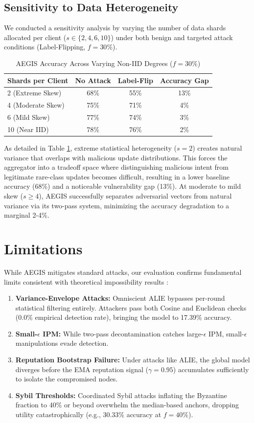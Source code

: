 \documentclass[10pt, conference]{IEEEtran}
\begin{document}
\subsection{Sensitivity to Data Heterogeneity}
We conducted a sensitivity analysis by varying the number of data shards allocated per client ($s \in \{2, 4, 6, 10\}$) under both benign and targeted attack conditions (Label-Flipping, $f=30\%$). 

\begin{table}[htbp]
\centering
\caption{AEGIS Accuracy Across Varying Non-IID Degrees ($f=30\%$)}
\begin{tabular}{@{}lccc@{}}
\toprule
\textbf{Shards per Client} & \textbf{No Attack} & \textbf{Label-Flip} & \textbf{Accuracy Gap} \\ \midrule
2 (Extreme Skew) & 68\% & 55\% & 13\% \\
4 (Moderate Skew) & 75\% & 71\% & 4\% \\
6 (Mild Skew) & 77\% & 74\% & 3\% \\
10 (Near IID) & 78\% & 76\% & 2\% \\ \bottomrule
\end{tabular}
\label{tab:shards}
\end{table}

As detailed in Table \ref{tab:shards}, extreme statistical heterogeneity ($s=2$) creates natural variance that overlaps with malicious update distributions. This forces the aggregator into a tradeoff space where distinguishing malicious intent from legitimate rare-class updates becomes difficult, resulting in a lower baseline accuracy (68\%) and a noticeable vulnerability gap (13\%). At moderate to mild skew ($s \ge 4$), AEGIS successfully separates adversarial vectors from natural variance via its two-pass system, minimizing the accuracy degradation to a marginal 2-4\%.

\section{Limitations}
While AEGIS mitigates standard attacks, our evaluation confirms fundamental limits consistent with theoretical impossibility results \cite{baruch2019}:
\begin{enumerate}
    \item \textbf{Variance-Envelope Attacks:} Omniscient ALIE bypasses per-round statistical filtering entirely. Attackers pass both Cosine and Euclidean checks (0.0\% empirical detection rate), bringing the model to 17.39\% accuracy. 
    \item \textbf{Small-$\epsilon$ IPM:} While two-pass decontamination catches large-$\epsilon$ IPM, small-$\epsilon$ manipulations evade detection.
    \item \textbf{Reputation Bootstrap Failure:} Under attacks like ALIE, the global model diverges before the EMA reputation signal ($\gamma=0.95$) accumulates sufficiently to isolate the compromised nodes.
    \item \textbf{Sybil Thresholds:} Coordinated Sybil attacks inflating the Byzantine fraction to 40\% or beyond overwhelm the median-based anchors, dropping utility catastrophically (e.g., 30.33\% accuracy at $f=40\%$).
\end{enumerate}
\end{document}
